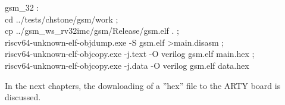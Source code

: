 \vspace{1in}
gsm\_32 :\\
\indent \space\space\space cd ../tests/chstone/gsm/work ;\\
\indent \space\space\space cp ../gsm\_ws\_rv32imc/gsm/Release/gsm.elf . ;\\
\indent \space\space\space riscv64-unknown-elf-objdump.exe -S gsm.elf \textgreater\space main.disasm ;\\
\indent \space\space\space riscv64-unknown-elf-objcopy.exe -j.text -O verilog gsm.elf main.hex ;\\
\indent \space\space\space riscv64-unknown-elf-objcopy.exe -j.data -O verilog gsm.elf data.hex

In the next chapters, the downloading of a ''hex'' file to the ARTY board is discussed.

